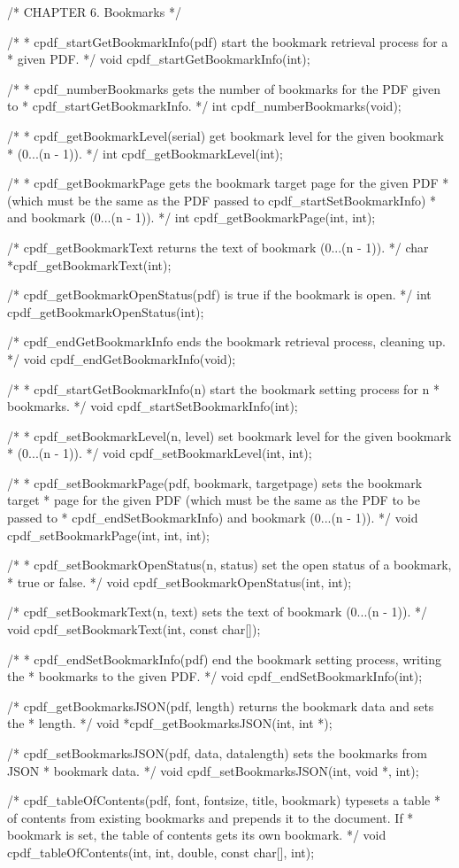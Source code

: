 /* CHAPTER 6. Bookmarks */

/*
 * cpdf_startGetBookmarkInfo(pdf) start the bookmark retrieval process for a
 * given PDF.
 */
void cpdf_startGetBookmarkInfo(int);

/*
 * cpdf_numberBookmarks gets the number of bookmarks for the PDF given to
 * cpdf_startGetBookmarkInfo.
 */
int cpdf_numberBookmarks(void);

/*
 * cpdf_getBookmarkLevel(serial) get bookmark level for the given bookmark
 * (0...(n - 1)).
 */
int cpdf_getBookmarkLevel(int);

/*
 * cpdf_getBookmarkPage gets the bookmark target page for the given PDF
 * (which must be the same as the PDF passed to cpdf_startSetBookmarkInfo)
 * and bookmark (0...(n - 1)).
 */
int cpdf_getBookmarkPage(int, int);

/* cpdf_getBookmarkText returns the text of bookmark (0...(n - 1)). */
char *cpdf_getBookmarkText(int);

/* cpdf_getBookmarkOpenStatus(pdf) is true if the bookmark is open. */
int cpdf_getBookmarkOpenStatus(int);

/* cpdf_endGetBookmarkInfo ends the bookmark retrieval process, cleaning up. */
void cpdf_endGetBookmarkInfo(void);

/*
 * cpdf_startGetBookmarkInfo(n) start the bookmark setting process for n
 * bookmarks.
 */
void cpdf_startSetBookmarkInfo(int);

/*
 * cpdf_setBookmarkLevel(n, level) set bookmark level for the given bookmark
 * (0...(n - 1)).
 */
void cpdf_setBookmarkLevel(int, int);

/*
 * cpdf_setBookmarkPage(pdf, bookmark, targetpage) sets the bookmark target
 * page for the given PDF (which must be the same as the PDF to be passed to
 * cpdf_endSetBookmarkInfo) and bookmark (0...(n - 1)).
 */
void cpdf_setBookmarkPage(int, int, int);

/*
 * cpdf_setBookmarkOpenStatus(n, status) set the open status of a bookmark,
 * true or false.
 */
void cpdf_setBookmarkOpenStatus(int, int);

/* cpdf_setBookmarkText(n, text) sets the text of bookmark (0...(n - 1)). */
void cpdf_setBookmarkText(int, const char[]);

/*
 * cpdf_endSetBookmarkInfo(pdf) end the bookmark setting process, writing the
 * bookmarks to the given PDF.
 */
void cpdf_endSetBookmarkInfo(int);

/* cpdf_getBookmarksJSON(pdf, length) returns the bookmark data and sets the
 * length. */
void *cpdf_getBookmarksJSON(int, int *);

/* cpdf_setBookmarksJSON(pdf, data, datalength) sets the bookmarks from JSON
 * bookmark data. */
void cpdf_setBookmarksJSON(int, void *, int);

/* cpdf_tableOfContents(pdf, font, fontsize, title, bookmark) typesets a table
 * of contents from existing bookmarks and prepends it to the document. If
 * bookmark is set, the table of contents gets its own bookmark. */
void cpdf_tableOfContents(int, int, double, const char[], int);


